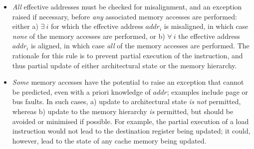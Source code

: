 \begin{itemize}

\item {\em All} effective addresses must be checked for misalignment, and
      an exception raised if necessary, before {\em any} associated memory 
      accesses are performed: either
      a) $\exists~i$ for which the effective address $addr_i$ is misaligned, 
         in which case {\em none} of the memory accesses are performed,
         or
      b) $\forall~i$           the effective address $addr_i$ is    aligned, 
         in which case {\em  all} of the memory accesses are performed.
      The rationale for this rule is to prevent partial execution of the
      instruction, and thus partial update of either architectural state
      or the memory hierarchy.

\item {\em Some} memory accesses have the potential to raise an exception
      that cannot be predicted, even with a priori knowledge of $addr$;
      examples include page or bus faults.  In such cases,
      a) update to 
         architectural state 
         {\em is not} permitted,
         whereas
      b) update to the 
         memory hierarchy
         {\em is}     permitted,
         but should be avoided or minimised if possible.
      For example, the partial execution of a load instruction would not
      lead to the destination register being updated; it could, however,
      lead to the state of any cache memory being updated.

\end{itemize}



